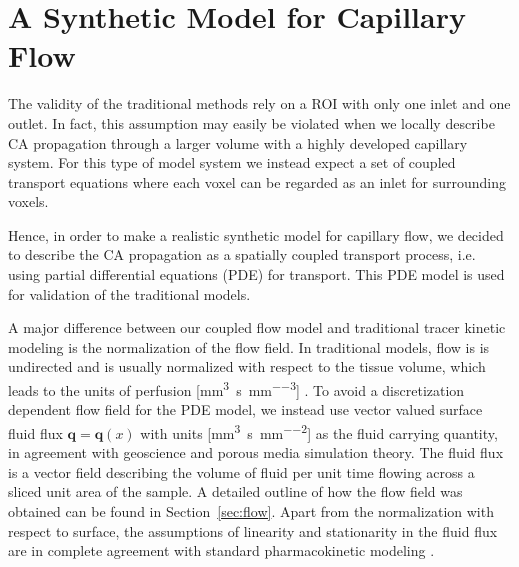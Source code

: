 \documentclass[journal,twocolumn]{IEEEtran}
\newcommand{\vq}{\mathbf{q}}
\newcommand{\siQmm}{\milli\meter\cubed\per\second\per\milli\meter\cubed}
\newcommand{\siq}{\milli\meter\cubed\per\second\per\milli\meter\squared}
\begin{document}
	
	
	\section{A Synthetic Model for Capillary Flow}\label{sec:synthetic}
	
	The validity of the traditional methods rely on a ROI with only one inlet and one outlet.
	In fact, this assumption may easily be violated when we locally describe CA propagation through a larger volume with a highly developed capillary system.
	For this type of model system we instead expect a set of coupled transport equations where each voxel can be regarded as an inlet for surrounding voxels.
	
	Hence, in order to make a realistic synthetic model for capillary flow, we decided to describe the CA propagation as a spatially coupled transport process, i.e. using partial differential equations (PDE) for transport. This PDE model is used for validation of the traditional models. 
	
	
	A major difference between our coupled flow model and traditional tracer kinetic modeling is the normalization of the flow field.
	In traditional models, flow is is undirected and is usually normalized with respect to the tissue volume, which leads to the units of perfusion [\si{\siQmm}] \cite{sourbron13}.
	To avoid a discretization dependent flow field for the PDE model, we instead use vector valued surface fluid flux $\vq = \vq(x)$ with units [\si{\siq}] as the fluid carrying quantity, in agreement with geoscience and porous media simulation theory.
	The fluid flux is a vector field describing the volume of fluid per unit time flowing across a sliced unit area of the sample.
	A detailed outline of how the flow field was obtained can be found in Section~\ref{sec:flow}.
	Apart from the normalization with respect to surface, the assumptions of linearity and stationarity in the fluid flux are in complete agreement with standard pharmacokinetic modeling \cite{sourbron13}.
	


			
	
\end{document}
